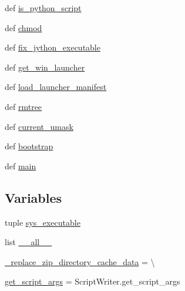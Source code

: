\begin{DoxyCompactItemize}
def \hyperlink{namespacesetuptools_1_1command_1_1easy__install_a9c5159f41f225ab1d518efaaee709eaf}{is\+\_\+python\+\_\+script}
\item 
def \hyperlink{namespacesetuptools_1_1command_1_1easy__install_a865f487c0bebb4fe236a30e47af1bc47}{chmod}
\item 
def \hyperlink{namespacesetuptools_1_1command_1_1easy__install_ab3139650fc1f996a2175b82da6368025}{fix\+\_\+jython\+\_\+executable}
\item 
def \hyperlink{namespacesetuptools_1_1command_1_1easy__install_a5c5a3eaf0aa34fd1b46e79f18ffc2bce}{get\+\_\+win\+\_\+launcher}
\item 
def \hyperlink{namespacesetuptools_1_1command_1_1easy__install_a7724303bf78833c452f552b89ca9c8ad}{load\+\_\+launcher\+\_\+manifest}
\item 
def \hyperlink{namespacesetuptools_1_1command_1_1easy__install_af7efd3f04d63ee788bf57f0f720cbb71}{rmtree}
\item 
def \hyperlink{namespacesetuptools_1_1command_1_1easy__install_a9c4090dda9dacda5a0a445628333fade}{current\+\_\+umask}
\item 
def \hyperlink{namespacesetuptools_1_1command_1_1easy__install_ae63b1ad4dd2c07c4831298205ba1bc99}{bootstrap}
\item 
def \hyperlink{namespacesetuptools_1_1command_1_1easy__install_ab71345d208f3aa78ccd5df466a80bd52}{main}
\end{DoxyCompactItemize}
\subsection*{Variables}
\begin{DoxyCompactItemize}
\item 
tuple \hyperlink{namespacesetuptools_1_1command_1_1easy__install_afc291a499906d82a7192ea88ae25f2a9}{sys\+\_\+executable}
\item 
list \hyperlink{namespacesetuptools_1_1command_1_1easy__install_a975283f0ff0f649e3be83d3476fe462f}{\+\_\+\+\_\+all\+\_\+\+\_\+}
\item 
\hyperlink{namespacesetuptools_1_1command_1_1easy__install_aa9f7d6a38e2d4a1ad18d11a1e978de2b}{\+\_\+replace\+\_\+zip\+\_\+directory\+\_\+cache\+\_\+data} = \textbackslash{}
\item 
\hyperlink{namespacesetuptools_1_1command_1_1easy__install_a267b9ab1d7874774429df54a3da6ad66}{get\+\_\+script\+\_\+args} = Script\+Writer.\+get\+\_\+script\+\_\+args
\end{DoxyCompactItemize}


